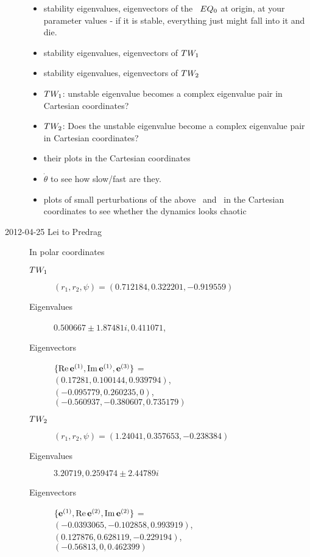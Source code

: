 \begin{description}
\begin{itemize}
  \item stability eigenvalues, eigenvectors of the \eqv\ $\EQV{0}$ at
        origin, at your parameter values - if it is stable, everything
        just might fall into it and die.
  \item stability eigenvalues, eigenvectors of $\REQV{}{1}$
  \item stability eigenvalues, eigenvectors of $\REQV{}{2}$
  \item $\REQV{}{1}$: unstable eigenvalue becomes a complex
        eigenvalue pair in Cartesian coordinates?
  \item $\REQV{}{2}$: Does the unstable eigenvalue become a complex
        eigenvalue pair in Cartesian coordinates?
  \item their plots in the Cartesian coordinates
  \item $\dot{\theta}$ to see how slow/fast are they.
  \item plots of small perturbations of the above \eqv\ and \reqva\ in
        the Cartesian coordinates to see whether the dynamics looks
        chaotic
\end{itemize}

\item[2012-04-25 Lei to Predrag] In polar coordinates
\begin{description}
\item[$\REQV{}{1}$] $(r_1,r_2,\psi)=(0.712184,0.322201,-0.919559)$
\item[Eigenvalues] ${0.500667 \pm 1.87481i, 0.411071}$,
\item[Eigenvectors] $\{ \Re \jEigvec[1], \Im \jEigvec[1], \jEigvec[3]\}$ =\\
$(0.17281, 0.100144 , 0.939794)$,\\
$(-0.095779, 0.260235, 0)$, \\
$(-0.560937, -0.380607, 0.735179)$
\item[$\REQV{}{2}$] $(r_1,r_2,\psi)=(1.24041,0.357653,-0.238384)$
\item[Eigenvalues] ${3.20719, 0.259474 \pm 2.44789 i}$
\item[Eigenvectors]  $\{ \jEigvec[1], \Re \jEigvec[2], \Im \jEigvec[2]\}$ =\\
$(-0.0393065, -0.102858, 0.993919)$, \\
$(0.127876, 0.628119, -0.229194)$, \\
$(- 0.56813, 0, 0.462399)$
\end{description}



\end{description}
